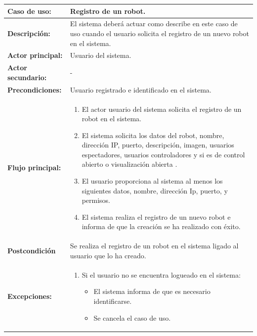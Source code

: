 \begin{table}[H]
  \begin{center}
    \begin{tabular}{|p{3.5cm}|p{10cm}|}
      \hline
      {\textbf{Caso de uso:}} & { Registro de un robot.} \\
      \hline
      {\textbf{Descripción:}} & { El sistema deberá actuar como describe en este caso de uso cuando el usuario solicita el registro de un nuevo robot en el sistema.} \\
     \hline
      {\textbf{Actor principal:}} & { Usuario del sistema.} \\
      \hline
      {\textbf{Actor secundario:}} & { - } \\
      \hline
      {\textbf{Precondiciones:}} & { Usuario registrado e identificado en el sistema. } \\
     \hline   
    {\textbf{Flujo principal:}} & { 
      \begin{enumerate}
	\item El actor usuario del sistema solicita el registro de un robot en el sistema.
	\item El sistema solicita los datos del robot, nombre, dirección IP, puerto, descripción, imagen, usuarios espectadores, usuarios controladores y si es de control abierto o visualización abierta .
	\item El usuario proporciona al sistema al menos los siguientes datos, nombre, dirección Ip, puerto, y permisos.
	\item El sistema realiza el registro de un nuevo robot e informa de que la creación se ha realizado con éxito.
      \end{enumerate}
      } \\
     \hline
     {\textbf{Postcondición}} & {Se realiza el registro de un robot en el sistema ligado al usuario que lo ha creado.}\\
     \hline
         {\textbf{Excepciones:}} & {
         \begin{enumerate}
         
          \item Si el usuario no se encuentra logueado en el sistema:
	  \begin{itemize}
	    \item El sistema informa de que es necesario identificarse.
	    \item Se cancela el caso de uso.
	  \end{itemize}
         

\end{enumerate}}
\end{tabular}
\end{center}
\end{table}
